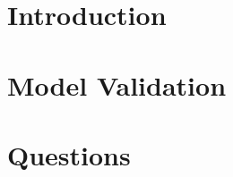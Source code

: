 \documentclass[12pt,twoside]{report}
\begin{document}

\thispagestyle{empty}



%

\tableofcontents

%






\chapter{Introduction}

\cleardoublepage

\chapter{Model Validation}

\cleardoublepage


\chapter{Questions}





\newpage
%
%
\end{document}
